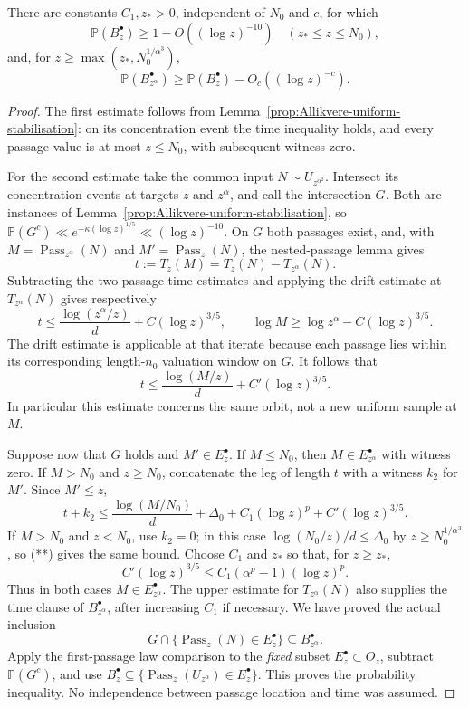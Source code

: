 \begin{lemma}
\label{lem:Allikvere-timed-step}
There are constants $C_1,z_*>0$, independent of $N_0$ and $c$, for which
\[
 \mathbb P(B_z^\bullet)\ge1-O((\log z)^{-10})
       \quad (z_*\le z\le N_0),
\]
and, for $z\ge\max(z_*,N_0^{1/\alpha^3})$,
\[
 \mathbb P(B_{z^\alpha}^\bullet)
       \ge\mathbb P(B_z^\bullet)-O_c((\log z)^{-c}).
\]
\end{lemma}
\begin{proof}
The first estimate follows from Lemma~\ref{prop:Allikvere-uniform-stabilisation}: on its
concentration event the time inequality holds, and every passage
value is at most $z\le N_0$, with subsequent witness zero.

For the second estimate take the common input $N\sim U_{z^{\alpha^2}}$.
Intersect its concentration events at targets $z$ and $z^\alpha$,
and call the intersection $G$. Both are instances of
Lemma~\ref{prop:Allikvere-uniform-stabilisation}, so
$\mathbb P(G^c)\ll e^{-\kappa(\log z)^{1/5}}\ll(\log z)^{-10}$.
On $G$ both passages exist, and, with
$M=\operatorname{Pass}_{z^\alpha}(N)$ and
$M'=\operatorname{Pass}_z(N)$, the nested-passage lemma gives
\[
 t:=T_z(M)=T_z(N)-T_{z^\alpha}(N).
\]
Subtracting the two passage-time estimates and applying the drift
estimate at $T_{z^\alpha}(N)$ gives respectively
\[
 t\le\frac{\log(z^\alpha/z)}d+C(\log z)^{3/5},
 \qquad
 \log M\ge\log z^\alpha-C(\log z)^{3/5}.
\]
The drift estimate is applicable at that iterate because each passage
lies within its corresponding length-$n_0$ valuation window on $G$.
It follows that
\[
 t\le\frac{\log(M/z)}d+C'(\log z)^{3/5}.                 \tag{**}
\]
In particular this estimate concerns the same orbit, not a new
uniform sample at $M$.

Suppose now that $G$ holds and $M'\in E_z^\bullet$. If $M\le N_0$,
then $M\in E_{z^\alpha}^\bullet$ with witness zero.
If $M>N_0$ and $z\ge N_0$, concatenate the leg of length $t$ with
a witness $k_2$ for $M'$. Since $M'\le z$,
\[
 t+k_2\le\frac{\log(M/N_0)}d+\Delta_0
                      +C_1(\log z)^p+C'(\log z)^{3/5}.
\]
If $M>N_0$ and $z<N_0$, use $k_2=0$; in this case
$\log(N_0/z)/d\le\Delta_0$ by $z\ge N_0^{1/\alpha^3}$,
so (**) gives the same bound. Choose $C_1$ and $z_*$ so that, for
$z\ge z_*$,
\[
 C'(\log z)^{3/5}
       \le C_1(\alpha^p-1)(\log z)^p.
\]
Thus in both cases $M\in E_{z^\alpha}^\bullet$.
The upper estimate for $T_{z^\alpha}(N)$ also supplies the time clause
of $B_{z^\alpha}^\bullet$, after increasing $C_1$ if necessary.
We have proved the actual inclusion
\[
 G\cap\{\operatorname{Pass}_z(N)\in E_z^\bullet\}
                  \subseteq B_{z^\alpha}^\bullet.
\]
Apply the first-passage law comparison to the \emph{fixed} subset
$E_z^\bullet\subset O_z$, subtract $\mathbb P(G^c)$, and use
$B_z^\bullet\subseteq
\{\operatorname{Pass}_z(U_{z^\alpha})\in E_z^\bullet\}$.
This proves the probability inequality. No independence between
passage location and time was assumed.
\end{proof}

